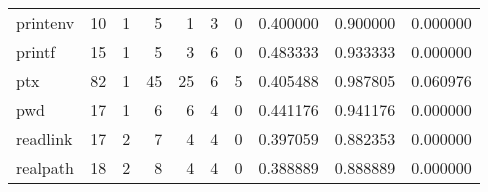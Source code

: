 \begin{tabular}{lrrrrrrrrr}
printenv  &                                       10 &                                                  1 &                                                  5 &                                                  1 &                                                  3 &                                                  0 &                                           0.400000 &                               0.900000 &                             0.000000 \\
printf    &                                       15 &                                                  1 &                                                  5 &                                                  3 &                                                  6 &                                                  0 &                                           0.483333 &                               0.933333 &                             0.000000 \\
ptx       &                                       82 &                                                  1 &                                                 45 &                                                 25 &                                                  6 &                                                  5 &                                           0.405488 &                               0.987805 &                             0.060976 \\
pwd       &                                       17 &                                                  1 &                                                  6 &                                                  6 &                                                  4 &                                                  0 &                                           0.441176 &                               0.941176 &                             0.000000 \\
readlink  &                                       17 &                                                  2 &                                                  7 &                                                  4 &                                                  4 &                                                  0 &                                           0.397059 &                               0.882353 &                             0.000000 \\
realpath  &                                       18 &                                                  2 &                                                  8 &                                                  4 &                                                  4 &                                                  0 &                                           0.388889 &                               0.888889 &                             0.000000 \\

\end{tabular}
